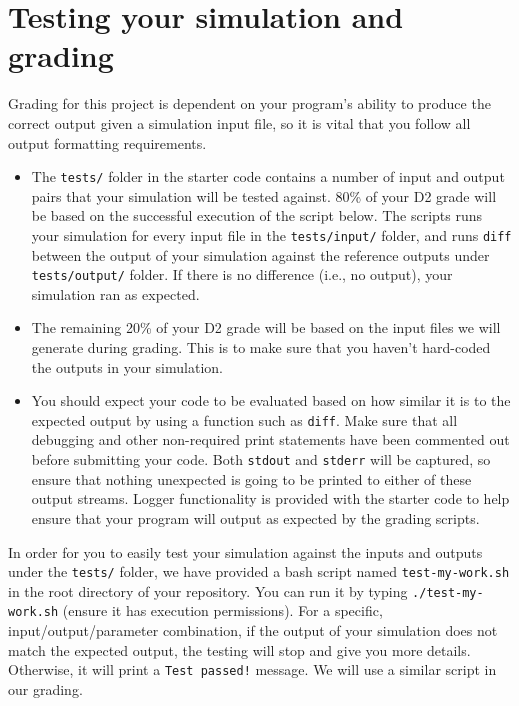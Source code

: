 \documentclass[main.tex]{subfiles}
\begin{document}
\section{Testing your simulation and grading}
\label{sec:grading}
Grading for this project is dependent on your program's ability to produce the correct output given a simulation input file, so it is vital that you follow all output formatting requirements.
\begin{itemize}
    \item The \texttt{tests/} folder in the starter code contains a number of input and output pairs that your simulation will be tested against. 80\% of your D2 grade will be based on the successful execution of the script below. The scripts runs your simulation for every input file in the \texttt{tests/input/} folder, and runs \texttt{diff} between the output of your simulation against the reference outputs under \texttt{tests/output/} folder. If there is no difference (i.e., no output), your simulation ran as expected. 
    \item The remaining 20\% of your D2 grade will be based on the input files we will generate during grading. This is to make sure that you haven't hard-coded the outputs in your simulation. 
    \item You should expect your code to be evaluated based on how similar it is to the expected output by using a function such as \texttt{diff}. Make sure that all debugging and other non-required print statements have been commented out before submitting your code. Both \texttt{stdout} and \texttt{stderr} will be captured, so ensure that nothing unexpected is going to be printed to either of these output streams. Logger functionality is provided with the starter code to help ensure that your program will output as expected by the grading scripts.
\end{itemize}

In order for you to easily test your simulation against the inputs and outputs under the \texttt{tests/} folder, we have provided a bash script named \texttt{test-my-work.sh} in the root directory of your repository. You can run it by typing \texttt{./test-my-work.sh} (ensure it has execution permissions). For a specific, input/output/parameter combination, if the output of your simulation does not match the expected output, the testing will stop and give you more details. Otherwise, it will print a \texttt{Test passed!} message. We will use a similar script in our grading. 
\end{document}
